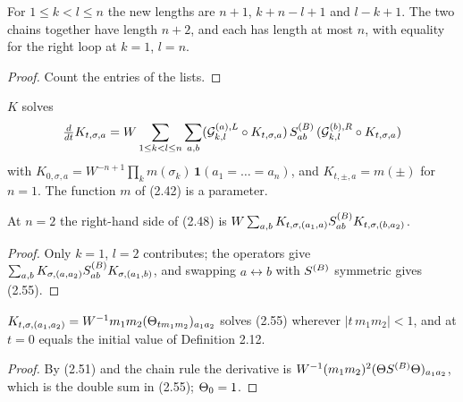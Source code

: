\begin{lemma}\label{lem:loops-length}
  \leanok{}
  For $1\le k<l\le n$ the new lengths are $n+1$, $k+n-l+1$ and $l-k+1$.  The two
  chains together have length $n+2$, and each has length at most $n$, with equality
  for the right loop at $k=1$, $l=n$.
\end{lemma}
\begin{proof}\leanok{}
  Count the entries of the lists.
\end{proof}

\begin{definition}\label{def:primitive}
  \leanok
  $K$ solves
  \[ \tfrac{d}{dt}K_{t,\sigma,a} = W\sum_{1\le k<l\le n}\sum_{a,b}
     (\mathcal{G}^{(a),L}_{k,l}\circ K_{t,\sigma,a})\,S^{(B)}_{ab}\,(\mathcal{G}^{(b),R}_{k,l}\circ K_{t,\sigma,a}) \]
  with $K_{0,\sigma,a}=W^{-n+1}\prod_k m(\sigma_k)\,\mathbf 1(a_1=\dots=a_n)$, and
  $K_{t,\pm,a}=m(\pm)$ for $n=1$.  The function $m$ of (2.42) is a parameter.
\end{definition}

\begin{lemma}[Index check at $n=2$, (2.55)]\label{eq:2.55}
  \leanok{}
  At $n=2$ the right-hand side of (2.48) is
  $W\sum_{a,b}K_{t,\sigma,(a_1,a)}S^{(B)}_{ab}K_{t,\sigma,(b,a_2)}$.
\end{lemma}
\begin{proof}\leanok{}
  Only $k=1$, $l=2$ contributes; the operators give
  $\sum_{a,b}K_{\sigma,(a,a_2)}S^{(B)}_{ab}K_{\sigma,(a_1,b)}$, and swapping $a\leftrightarrow b$
  with $S^{(B)}$ symmetric gives (2.55).
\end{proof}

\begin{lemma}[Example 2.15, (2.57)--(2.58)]\label{ex:2.15}
  \leanok
  $K_{t,\sigma,(a_1,a_2)}=W^{-1}m_1m_2(\Theta_{t m_1m_2})_{a_1a_2}$ solves (2.55) wherever
  $|t\,m_1m_2|<1$, and at $t=0$ equals the initial value of Definition 2.12.
\end{lemma}
\begin{proof}\leanok{}
  By (2.51) and the chain rule the derivative is $W^{-1}(m_1m_2)^2(\Theta S^{(B)}\Theta)_{a_1a_2}$,
  which is the double sum in (2.55); $\Theta_0=1$.
\end{proof}

